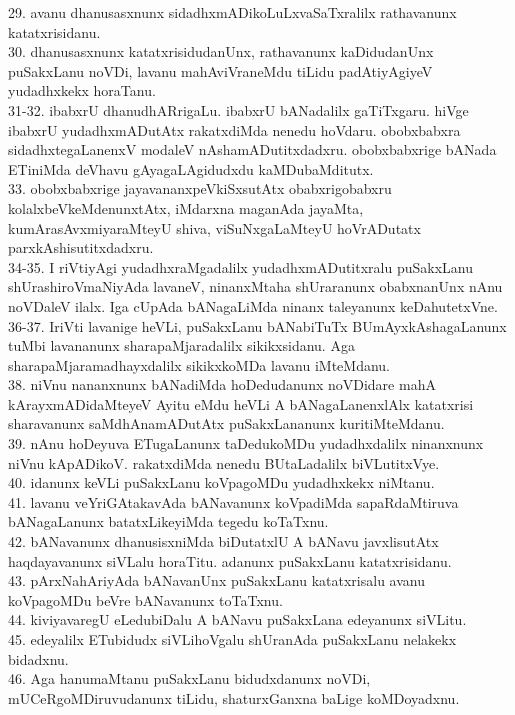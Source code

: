 \documentclass{article}
\begin{document}
29. avanu dhanusasxnunx sidadhxmADikoLuLxvaSaTxralilx rathavanunx katatxrisidanu.\\
30. dhanusasxnunx katatxrisidudanUnx, rathavanunx kaDidudanUnx puSakxLanu noVDi, lavanu mahAviVraneMdu tiLidu padAtiyAgiyeV yudadhxkekx horaTanu.\\
31-32. ibabxrU dhanudhARrigaLu. ibabxrU bANadalilx gaTiTxgaru. hiVge ibabxrU yudadhxmADutAtx rakatxdiMda nenedu hoVdaru. obobxbabxra sidadhxtegaLanenxV modaleV nAshamADutitxdadxru. obobxbabxrige bANada ETiniMda deVhavu gAyagaLAgidudxdu kaMDubaMditutx.\\
33. obobxbabxrige jayavananxpeVkiSxsutAtx obabxrigobabxru kolalxbeVkeMdenunxtAtx, iMdarxna maganAda jayaMta, kumArasAvxmiyaraMteyU shiva, viSuNxgaLaMteyU hoVrADutatx parxkAshisutitxdadxru.\\
34-35. I riVtiyAgi yudadhxraMgadalilx yudadhxmADutitxralu puSakxLanu shUrashiroVmaNiyAda lavaneV, ninanxMtaha shUraranunx obabxnanUnx nAnu noVDaleV ilalx. Iga cUpAda bANagaLiMda ninanx taleyanunx keDahutetxVne.\\
36-37. IriVti lavanige heVLi, puSakxLanu bANabiTuTx BUmAyxkAshagaLanunx tuMbi lavananunx sharapaMjaradalilx sikikxsidanu. Aga sharapaMjaramadhayxdalilx sikikxkoMDa lavanu iMteMdanu.\\
38. niVnu nananxnunx bANadiMda hoDedudanunx noVDidare mahA kArayxmADidaMteyeV Ayitu eMdu heVLi A bANagaLanenxlAlx katatxrisi sharavanunx saMdhAnamADutAtx puSakxLananunx kuritiMteMdanu.\\
39. nAnu hoDeyuva ETugaLanunx taDedukoMDu yudadhxdalilx ninanxnunx niVnu kApADikoV. rakatxdiMda nenedu BUtaLadalilx biVLutitxVye.\\
40. idanunx keVLi puSakxLanu koVpagoMDu yudadhxkekx niMtanu.\\
41. lavanu veYriGAtakavAda bANavanunx koVpadiMda sapaRdaMtiruva bANagaLanunx batatxLikeyiMda tegedu koTaTxnu.\\
42. bANavanunx dhanusisxniMda biDutatxlU A bANavu javxlisutAtx haqdayavanunx siVLalu horaTitu. adanunx puSakxLanu katatxrisidanu.\\
43. pArxNahAriyAda bANavanUnx puSakxLanu katatxrisalu avanu koVpagoMDu beVre bANavanunx toTaTxnu.\\
44. kiviyavaregU eLedubiDalu A bANavu puSakxLana edeyanunx siVLitu.\\
45. edeyalilx ETubidudx siVLihoVgalu shUranAda puSakxLanu nelakekx bidadxnu.\\
46. Aga hanumaMtanu puSakxLanu bidudxdanunx noVDi, mUCeRgoMDiruvudanunx tiLidu, shaturxGanxna baLige koMDoyadxnu.\\
\end{document}
